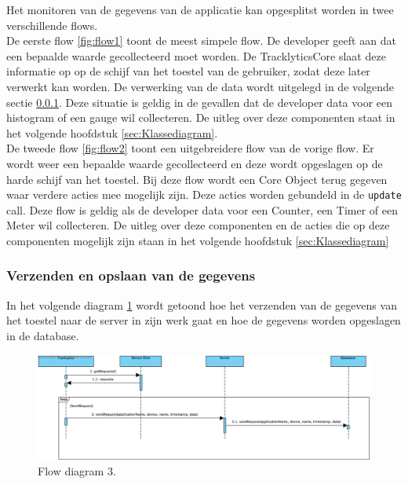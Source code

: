 Het monitoren van de gegevens van de applicatie kan opgesplitst worden in twee verschillende flows. \\

De eerste flow \ref{fig:flow1} toont de meest simpele flow. De developer geeft aan dat een bepaalde waarde gecollecteerd moet worden. De TracklyticsCore slaat deze informatie op op de schijf van het toestel van de gebruiker, zodat deze later verwerkt kan worden. De verwerking van de data wordt uitgelegd in de volgende sectie \ref{sec:VerzendenEnOpslaanVanGegevens}. Deze situatie is geldig in de gevallen dat de developer data voor een histogram of een gauge wil collecteren. De uitleg over deze componenten staat in het volgende hoofdstuk \ref{sec:Klassediagram}.\\

De tweede flow \ref{fig:flow2} toont een uitgebreidere flow van de vorige flow. Er wordt weer een bepaalde waarde gecollecteerd en deze wordt opgeslagen op de harde schijf van het toestel. Bij deze flow wordt een Core Object terug gegeven waar verdere acties mee mogelijk zijn. Deze acties worden gebundeld in de \texttt{update} call. Deze flow is geldig als de developer data voor een Counter, een Timer of een Meter wil collecteren. De uitleg over deze componenten en de acties die op deze componenten mogelijk zijn staan in het volgende hoofdstuk \ref{sec:Klassediagram} \\


\subsubsection{Verzenden en opslaan van de gegevens} \label{sec:VerzendenEnOpslaanVanGegevens}
In het volgende diagram \ref{fig:flow3} wordt getoond hoe het verzenden van de gegevens van het toestel naar de server in zijn werk gaat en hoe de gegevens worden opgeslagen in de database. 
\begin{figure}[!h]
  \centering
  \includegraphics[scale=0.4]{Afbeeldingen/Architectuur/FlowDiagram3}
  \caption{Flow diagram 3.}
  \label{fig:flow3}
\end{figure}










